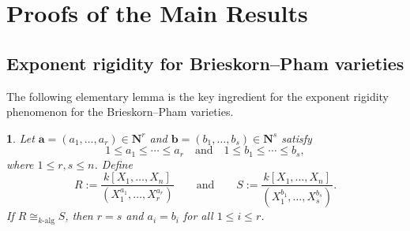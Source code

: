 \documentclass[english,10pt,reqno,twoside]{amsart}
\numberwithin{equation}{section}
\numberwithin{figure}{section}
\theoremstyle{plain}
\theoremstyle{plain}
\newtheorem{lem}[thm]{\protect\lemmaname}
\theoremstyle{definition}
\providecommand{\lemmaname}{Lemma}
\theoremstyle{plain}
\numberwithin{equation}{section}
\newcommand{\N}{\mathbf{N}}
\newcommand{\ba}{\mathbf{a}}
\newcommand{\bb}{\mathbf{b}}
\begin{document}
\section{\bf Proofs of the Main Results}\label{se3}
\subsection{Exponent rigidity for Brieskorn--Pham varieties}\label{subse3.1}
The following elementary lemma is the key ingredient for the exponent rigidity phenomenon for the Brieskorn--Pham varieties.

\begin{lem}\label{Lem: Key Lemma}
Let $\ba=(a_1,\ldots,a_r)\in\N^r$ and $\bb=(b_1,\ldots,b_s)\in\N^s$ satisfy
\[
1\le a_1\le \cdots\le a_r
\quad\text{and}\quad
1\le b_1\le \cdots\le b_s,
\]
where $1\leq r,s\le n$. Define
\[
R:=\frac{k[X_1,\ldots,X_n]}{(X_1^{a_1},\ldots,X_r^{a_r})}
\qquad\text{and}\qquad
S:=\frac{k[X_1,\ldots,X_n]}{(X_1^{b_1},\ldots,X_s^{b_s})}.
\]
If $R\cong_{k\text{-alg}} S$, then $r=s$ and $a_i=b_i$ for all $1\le i\le r$.
\end{lem}
\end{document}

